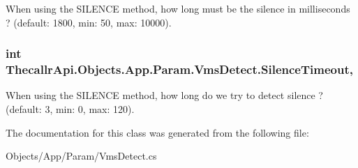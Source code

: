 When using the S\+I\+L\+E\+N\+C\+E method, how long must be the silence in milliseconds ? (default\+: 1800, min\+: 50, max\+: 10000). 

\hypertarget{class_thecallr_api_1_1_objects_1_1_app_1_1_param_1_1_vms_detect_a6c1c058d7dd3b3a64c70fee7e21e38a4}{
\subsubsection[{Silence\+Timeout}]{\setlength{\rightskip}{0pt plus 5cm}int Thecallr\+Api.\+Objects.\+App.\+Param.\+Vms\+Detect.\+Silence\+Timeout\hspace{0.3cm}{\ttfamily [get]}, {\ttfamily [set]}}}\label{class_thecallr_api_1_1_objects_1_1_app_1_1_param_1_1_vms_detect_a6c1c058d7dd3b3a64c70fee7e21e38a4}


When using the S\+I\+L\+E\+N\+C\+E method, how long do we try to detect silence ? (default\+: 3, min\+: 0, max\+: 120). 



The documentation for this class was generated from the following file\+:\begin{DoxyCompactItemize}
\item 
Objects/\+App/\+Param/Vms\+Detect.\+cs\end{DoxyCompactItemize}
